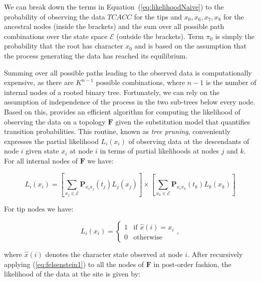 We can break down the terms in Equation~(\ref{eq:likelihoodNaive}) 
to the probability of observing the data $TCACC$ for the tips and $x_{0},x_{6},x_{7},x_{8}$ for the ancestral nodes (inside the brackets) and the sum over all possible path combinations over the state space $\mathcal{E}$ (outside the brackets).
Term $\pi_{0}$ is simply the probability that the root has character $x_{0}$ and is based on the assumption that the process generating the data has reached its equilibrium.

Summing over all possible paths leading to the observed data is computationally expensive, as there are  $K^{n-1}$ possible combinations, where $n-1$ is the number of internal nodes of a rooted binary tree.
Fortunately, we can rely on the assumption of independence of the process in the two sub-trees below every node.
Based on this, \citet{Felsenstein1981} provides an efficient algorithm for computing the likelihood of observing the data on a topology $\mathbf{F}$ given the substitution model that quantifies transition probabilities.
This routine, known as \emph{tree pruning}, conveniently expresses the partial likelihood $L_{i}(x_{i})$ of observing data at the descendants of node $i$ given state $x_{i}$ at node $i$ in terms of partial likelihoods at nodes $j$ and $k$.
For all internal nodes of $\mathbf{F}$ we have:

\begin{equation}
L_{i}(x_{i})=\left[\underset{x_{j}\in \mathcal{E}}{\sum}\mathbf{P}_{x_{i}x_{j}}(t_{j})L_{j}(x_{j})\right]\times\left[\underset{x_{k}\in \mathcal{E}}{\sum}\mathbf{P}_{x_{i}x_{k}}(t_{k})L_{k}(x_{k})\right]
\label{eq:felsenstein1}
\end{equation}

\noindent
For tip nodes we have:

\begin{equation}
L_{i}(x_{i})=\begin{cases}
1 & \text{if }\hat{x}(i)=x_{i}\\
0 & \text{otherwise}
\end{cases},
\label{eq:felsenstein2}
\end{equation}

\noindent
where $\hat{x}(i)$ denotes the character state observed at node $i$.
After recursively applying (\ref{eq:felsenstein1}) to all the nodes of $\mathbf{F}$ in post-order fashion, the likelihood of the data at the site is given by:

